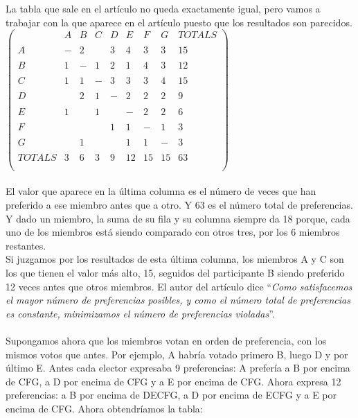 \documentclass[a4paper]{article}
\begin{document}
	La tabla que sale en el artículo no queda exactamente igual, pero vamos a trabajar con la que aparece en el artículo puesto que los resultados son parecidos.\\
	
\hspace{3cm}$\begin{pmatrix}
     & A & B & C & D & E & F & G & TOTALS\\ \\
   A & - & 2 &   & 3 & 4 & 3 & 3 & 15\\ \\
   B & 1 & - & 1 & 2 & 1 & 4 & 3 & 12\\\\
   C & 1 & 1 & - & 3 & 3 & 3 & 4 & 15\\\\
   D &   & 2 & 1 & - & 2 & 2 & 2 & 9\\\\
   E & 1 &   & 1 &   & - & 2 & 2 & 6\\\\
   F &   &   &   & 1 & 1 & - & 1 & 3\\\\
   G &   & 1 &   &   & 1 & 1 & - & 3\\\\
   TOTALS  & 3 & 6 & 3 & 9 & 12 & 15 & 15 & 63\\\\
\end{pmatrix}$\\
	\\
	
	 El valor que aparece en la última columna es el número de veces que han preferido a ese miembro antes que a otro. Y 63 es el número total de preferencias.
Y dado un miembro, la suma de su fila y su columna siempre da 18 porque, cada uno de los miembros está siendo comparado con otros tres, por los 6 miembros restantes.\\

Si juzgamos por los resultados de esta última columna, los miembros A y C son los que tienen el valor más alto, 15, seguidos del participante B siendo preferido 12 veces antes que otros miembros. El autor del artículo dice “\textit{Como satisfacemos el mayor número de preferencias posibles, y como el número total de preferencias es constante, minimizamos el número de preferencias violadas}”.\\\\


Supongamos ahora que los miembros votan en orden de preferencia, con los mismos votos que antes. Por ejemplo, A habría votado primero B, luego D y por último E. Antes cada elector expresaba 9 preferencias: A prefería a B por encima de CFG, a D por encima de CFG y a E por encima de CFG. Ahora expresa 12 preferencias: a B por encima de DECFG, a D por encima de ECFG y a E por encima de CFG. Ahora obtendríamos la tabla:\\
\end{document}
